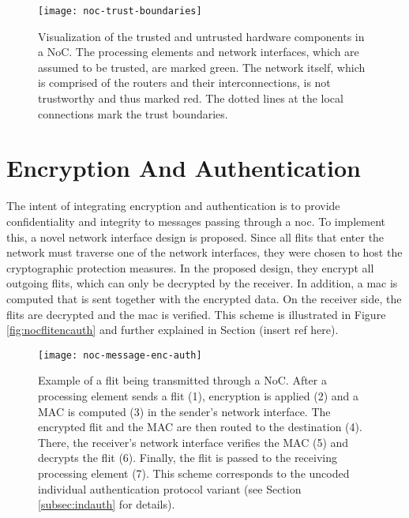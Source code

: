 \begin{figure}
    \centering
    \texttt{[image: noc-trust-boundaries]}
    \caption[Trust boundaries in a NoC]{Visualization of the trusted and untrusted hardware components in a NoC. The processing elements and network
    interfaces, which are assumed to be trusted, are marked green. The network itself, which is comprised of the routers and their interconnections,
    is not trustworthy and thus marked red. The dotted lines at the local connections mark the trust boundaries.}
    \label{fig:noctrustboundaries}
\end{figure}

\section{Encryption And Authentication}\label{sec:encandauth}
The intent of integrating encryption and authentication is to provide confidentiality and integrity to messages passing through a \gls{noc}. To
implement this, a novel network interface design is proposed. Since all flits that enter the network must traverse one of the network interfaces,
they were chosen to host the cryptographic protection measures. In the proposed design, they encrypt all outgoing flits, which can only be decrypted by the
receiver. In addition, a \gls{mac} is computed that is sent together with the encrypted data. On the receiver side, the flits are decrypted and the
\gls{mac} is verified. This scheme is illustrated in Figure \vref{fig:nocflitencauth} and further explained in Section (insert ref here).

\begin{figure}
    \centering
    \texttt{[image: noc-message-enc-auth]}
    \caption[Flit in a NoC with encryption and authentication]{Example of a flit being transmitted through a NoC. After a processing element sends a flit (1),
    encryption is applied (2) and a MAC is computed (3) in the sender's network interface. The encrypted flit and the MAC are then routed to the
    destination (4). There, the receiver's network interface verifies the MAC (5) and decrypts the flit (6). Finally, the flit is passed to the
    receiving processing element (7). This scheme corresponds to the uncoded individual authentication protocol variant (see Section
    \ref{subsec:indauth} for details).}
    \label{fig:nocflitencauth}
\end{figure}


